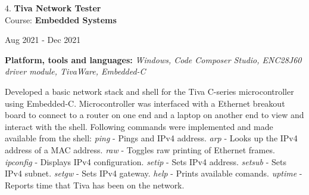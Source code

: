 \documentclass[10pt]{article}
\newenvironment{innerlist}[1][\enskip\textbullet]%
        {\begin{compactitem}[#1]}{\end{compactitem}}
\newenvironment{loneinnerlist}[1][\enskip\textbullet]%
        {\vspace{-\baselineskip}\begin{compactitem}[#1]}
        {\end{compactitem}\vspace{-.6\baselineskip}}
\begin{document}
\begin{loneinnerlist}
\item[4.]\textbf{Tiva Network Tester} \\ 
\vspace{4pt}
Course: \textbf{Embedded Systems} \\
\vspace*{-28pt} \begin{flushright} Aug 2021 - Dec 2021 \end{flushright}
\textbf{Platform, tools and languages:} \emph{Windows, Code Composer Studio, ENC28J60 driver module, TivaWare, Embedded-C}
\vspace*{2pt}
\begin{innerlist} \item Developed a basic network stack and shell for the Tiva C-series microcontroller using Embedded-C. Microcontroller was interfaced with a Ethernet breakout board to connect to a router on one end and a laptop on another end to view and interact with the shell. Following commands were implemented and made available from the shell:
   \subitem \emph{ping} - Pings and IPv4 address.
   \subitem \emph{arp} - Looks up the IPv4 address of a MAC address.
   \subitem \emph{raw} - Toggles raw printing of Ethernet frames.
   \subitem \emph{ipconfig} - Displays IPv4 configuration.
   \subitem \emph{setip} - Sets IPv4 address.
   \subitem \emph{setsub} - Sets IPv4 subnet.
   \subitem \emph{setgw} - Sets IPv4 gateway.
   \subitem \emph{help} - Prints available comands.
   \subitem \emph{uptime} - Reports time that Tiva has been on the network.
\end{innerlist}  \vspace*{4pt}


\end{loneinnerlist}
\end{document}
